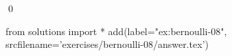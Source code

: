 
\begin{ex} 
  \label{ex:bernoulli-08}
  
  \qed
\end{ex} 
\begin{python0}
from solutions import *
add(label="ex:bernoulli-08",
    srcfilename='exercises/bernoulli-08/answer.tex') 
\end{python0}
